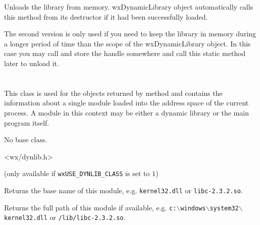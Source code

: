 
Unloads the library from memory. wxDynamicLibrary object automatically calls
this method from its destructor if it had been successfully loaded.

The second version is only used if you need to keep the library in memory
during a longer period of time than the scope of the wxDynamicLibrary object.
In this case you may call  and store
the handle somewhere and call this static method later to unload it.


\section{}\label{wxdynamiclibrarydetails}

This class is used for the objects returned by 
 method and
contains the information about a single module loaded into the address space of
the current process. A module in this context may be either a dynamic library
or the main program itself.


No base class.


<wx/dynlib.h>

(only available if \texttt{wxUSE\_DYNLIB\_CLASS} is set to $1$)


\label{wxdynamiclibrarygetname}


Returns the base name of this module, e.g. \texttt{kernel32.dll} or 
\texttt{libc-2.3.2.so}.


\label{wxdynamiclibrarygetpath}


Returns the full path of this module if available, e.g. 
\texttt{c:$\backslash$windows$\backslash$system32$\backslash$kernel32.dll} or 
\texttt{/lib/libc-2.3.2.so}.


\label{wxdynamiclibrarygetaddress}

